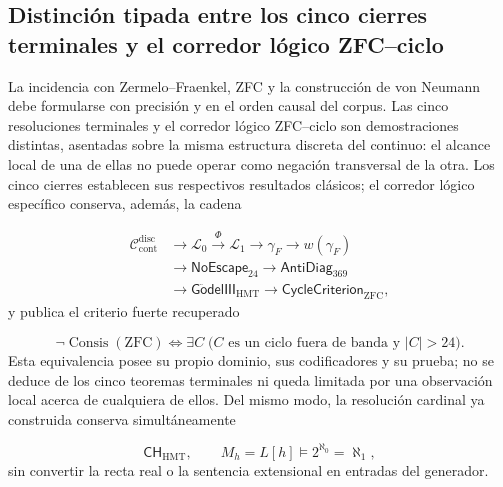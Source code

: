 \subsection{Distinción tipada entre los cinco cierres terminales y el corredor lógico ZFC--ciclo}
La incidencia con Zermelo--Fraenkel, ZFC y la construcción de von Neumann debe formularse con precisión y en el orden causal del corpus. Las cinco resoluciones terminales y el corredor lógico ZFC--ciclo son demostraciones distintas, asentadas sobre la misma estructura discreta del continuo: el alcance local de una de ellas no puede operar como negación transversal de la otra. Los cinco cierres establecen sus respectivos resultados clásicos; el corredor lógico específico conserva, además, la cadena\par
\[
\begin{aligned}
 \mathcal C_{\mathrm{cont}}^{\mathrm{disc}}
 &\longrightarrow\mathcal L_0\xrightarrow{\Phi}\mathcal L_1
 \longrightarrow\gamma_F\longrightarrow w(\gamma_F)\\
 &\longrightarrow\mathsf{NoEscape}_{24}
 \longrightarrow\mathsf{AntiDiag}_{369}\\
 &\longrightarrow\mathsf{G\ddot{o}delIII}_{\mathrm{HMT}}
 \longrightarrow\mathsf{CycleCriterion}_{\mathrm{ZFC}},
\end{aligned}
\]
y publica el criterio fuerte recuperado\par
\[
 \boxed{
 \neg\operatorname{Consis}(\mathrm{ZFC})
 \Longleftrightarrow
 \exists C\;\bigl(C\text{ es un ciclo fuera de banda y }|C|>24\bigr).}
\]
Esta equivalencia posee su propio dominio, sus codificadores y su prueba; no se deduce de los cinco teoremas terminales ni queda limitada por una observación local acerca de cualquiera de ellos. Del mismo modo, la resolución cardinal ya construida conserva simultáneamente\par
\[
 \mathsf{CH}_{\mathrm{HMT}},
 \qquad
 M_h=L[h]\models 2^{\aleph_0}=\aleph_1,
\]
sin convertir la recta real o la sentencia extensional en entradas del generador.\par

